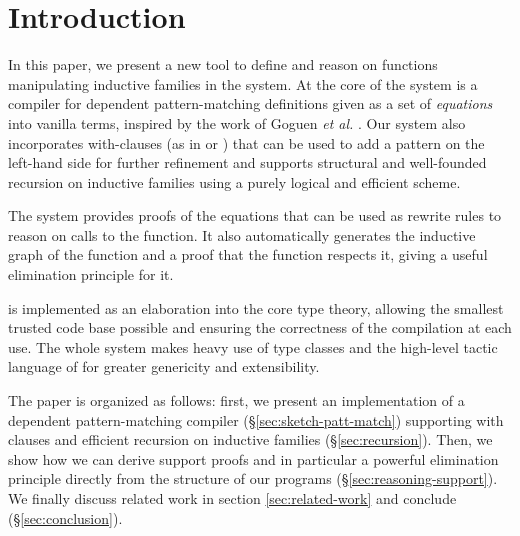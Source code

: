 \section{Introduction}

In this paper, we present a new tool to define and reason on functions
manipulating inductive families in the \Coq system.
At the core of the system is a compiler for dependent pattern-matching
definitions given as a set of \textit{equations} into vanilla \Coq
terms, inspired by the work of Goguen {\it et al.}
\cite{DBLP:conf/birthday/GoguenMM06} . Our system also incorporates 
with-clauses (as in \Epigram or \Agda) that can be used to add a pattern
on the left-hand side for further refinement and supports structural and
well-founded recursion on inductive families using a purely logical and
efficient scheme.

The system provides proofs of the equations that can be used as
rewrite rules to reason on calls to the function. It also
automatically generates the inductive graph of the function and a
proof that the function respects it, giving a useful elimination
principle for it.

\Equations is implemented as an elaboration into the core \Coq type
theory, allowing the smallest trusted code base possible and ensuring 
the correctness of the compilation at each use.
The whole system makes heavy use of type classes and the high-level
tactic language of \Coq for greater genericity and extensibility.

The paper is organized as follows: first, we present an implementation of a
dependent pattern-matching compiler (\S \ref{sec:sketch-patt-match})
supporting with clauses and efficient recursion on inductive families
(\S \ref{sec:recursion}). Then, we show how we can derive support proofs
and in particular a powerful elimination principle directly from the
structure of our programs (\S \ref{sec:reasoning-support}). We finally
discuss related work in section \ref{sec:related-work} and conclude (\S \ref{sec:conclusion}).

